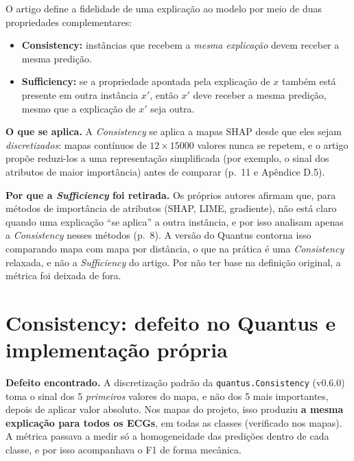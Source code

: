 \documentclass[11pt,a4paper]{article}
\begin{document}
O artigo define a fidelidade de uma explicação ao modelo por meio de duas propriedades complementares:
\begin{itemize}
    \item \textbf{Consistency:} instâncias que recebem a \emph{mesma explicação} devem receber a mesma predição.
    \item \textbf{Sufficiency:} se a propriedade apontada pela explicação de $x$ também está presente em outra instância $x'$, então $x'$ deve receber a mesma predição, mesmo que a explicação de $x'$ seja outra.
\end{itemize}

\textbf{O que se aplica.} A \textit{Consistency} se aplica a mapas SHAP desde que eles sejam \emph{discretizados}: mapas contínuos de $12 \times 15000$ valores nunca se repetem, e o artigo propõe reduzi-los a uma representação simplificada (por exemplo, o sinal dos atributos de maior importância) antes de comparar (p.~11 e Apêndice D.5).

\textbf{Por que a \textit{Sufficiency} foi retirada.} Os próprios autores afirmam que, para métodos de importância de atributos (SHAP, LIME, gradiente), não está claro quando uma explicação ``se aplica'' a outra instância, e por isso analisam apenas a \textit{Consistency} nesses métodos (p.~8). A versão do Quantus contorna isso comparando mapa com mapa por distância, o que na prática é uma \textit{Consistency} relaxada, e não a \textit{Sufficiency} do artigo. Por não ter base na definição original, a métrica foi deixada de fora.

\section{Consistency: defeito no Quantus e implementação própria}

\textbf{Defeito encontrado.} A discretização padrão da \texttt{quantus.Consistency} (v0.6.0) toma o sinal dos 5 \emph{primeiros} valores do mapa, e não dos 5 mais importantes, depois de aplicar valor absoluto. Nos mapas do projeto, isso produziu \textbf{a mesma explicação para todos os ECGs}, em todas as classes (verificado nos mapas). A métrica passava a medir só a homogeneidade das predições dentro de cada classe, e por isso acompanhava o F1 de forma mecânica.
\end{document}
